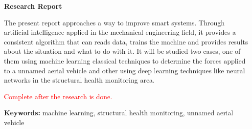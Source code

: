 \begin{center}
	\vspace{100pt}
	{\Large\bfseries\sffamily Research Report}
\end{center}
\noindent
The present report approaches a way to improve smart systems. Through artificial intelligence applied in the mechanical engineering field, it provides a consistent algorithm that can reads data, trains the machine and provides results about the situation and what to do with it. It will be studied two cases, one of them using machine learning classical techniques to determine the forces applied to a unnamed aerial vehicle and other using deep learning techniques like neural networks in the structural health monitoring area. 

\noindent
\textcolor{red}{Complete after the research is done.}

\noindent
{\bfseries Keywords:} machine learning, structural health monitoring, unnamed aerial vehicle

\clearpage